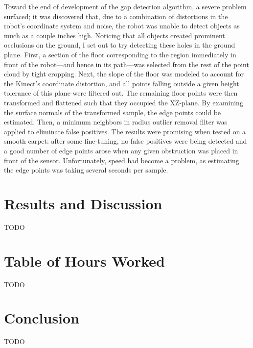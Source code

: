 \documentclass[12pt]{report}
\begin{document}
Toward the end of development of the gap detection algorithm, a severe problem surfaced; it was discovered that, due to a combination of distortions in the robot's coordinate system and noise, the robot was unable to detect objects as much as a couple inches high.  Noticing that all objects created prominent occlusions on the ground, I set out to try detecting these holes in the ground plane.  First, a section of the floor corresponding to the region immediately in front of the robot---and hence in its path---was selected from the rest of the point cloud by tight cropping.  Next, the slope of the floor was modeled to account for the Kinect's coordinate distortion, and all points falling outside a given height tolerance of this plane were filtered out.  The remaining floor points were then transformed and flattened such that they occupied the XZ-plane.  By examining the surface normals of the transformed sample, the edge points could be estimated.  Then, a minimum neighbors in radius outlier removal filter was applied to eliminate false positives.  The results were promising when tested on a smooth carpet: after some fine-tuning, no false positives were being detected and a good number of edge points arose when any given obstruction was placed in front of the sensor.  Unfortunately, speed had become a problem, as estimating the edge points was taking several seconds per sample.

\section{Results and Discussion}
TODO

\section{Table of Hours Worked}
TODO

\section{Conclusion}
TODO
\end{document}

